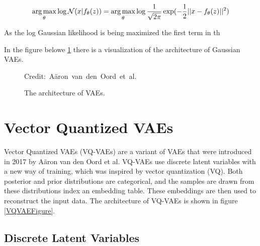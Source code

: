 \begin{equation} \label{eqMSE}
    \begin{split}
        \operatorname*{arg\,max}_{\theta} \log \mathcal{N}(x|f_{\theta}(z)) & = \operatorname*{arg\,max}_{\theta} \log \frac{1}{\sqrt{2\pi}} \exp(-\frac{1}{2} ||x - f_{\theta}(z)||^2) \\
    \end{split}
\end{equation}

As the log Gaussian likelihood is being maximized the first term in th

In the figure belowe \ref{VAEFigure} there is a visualization of the architecture of Gaussian VAEs.



\begin{figure}[H]
    \centering

    \caption{ The architecture of VAEs.}
  	\medskip 
	\hspace*{15pt}\hbox{\scriptsize Credit: Aäron van den Oord et al.}
    \label{VAEFigure}
\end{figure}

\section{Vector Quantized VAEs}

Vector Quantized VAEs (VQ-VAEs) are a variant of VAEs that were introduced in 2017 by Aäron van den Oord et al\cite{vqvae}. VQ-VAEs use discrete latent variables with a new way of training, which was inspired by vector quantization (VQ). Both posterior and prior distributions are categorical, and the samples are drawn from these distributions index an embedding table\cite{vqvae}. These embeddings are then used to reconstruct the input data. The architecture of VQ-VAEs is shown in figure \ref{VQVAEFigure}.

\subsection {Discrete Latent Variables}

